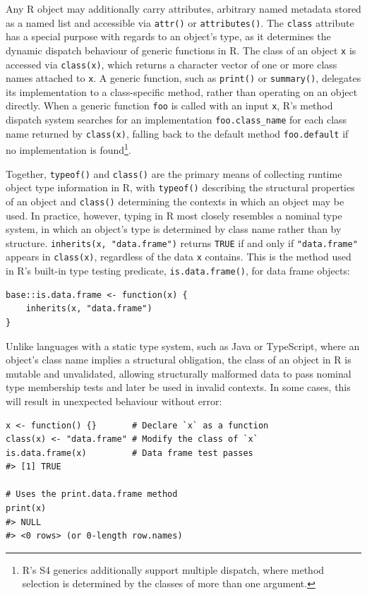 Any R object may additionally carry attributes, arbitrary named metadata stored as a named list and accessible via \texttt{attr()} or \texttt{attributes()}. The \texttt{class} attribute has a special purpose with regards to an object's type, as it determines the dynamic dispatch behaviour of generic functions in R. The class of an object \texttt{x} is accessed via \texttt{class(x)}, which returns a character vector of one or more class names attached to \texttt{x}. A generic function, such as \texttt{print()} or \texttt{summary()}, delegates its implementation to a class-specific method, rather than operating on an object directly. When a generic function \texttt{foo} is called with an input \texttt{x}, R's method dispatch system searches for an implementation \texttt{foo.class\_name} for each class name returned by \texttt{class(x)}, falling back to the default method \texttt{foo.default} if no implementation is found\footnote{R's S4 generics additionally support multiple dispatch, where method selection is determined by the classes of more than one argument.}.

Together, \texttt{typeof()} and \texttt{class()} are the primary means of collecting runtime object type information in R, with \texttt{typeof()} describing the structural properties of an object and \texttt{class()} determining the contexts in which an object may be used. In practice, however, typing in R most closely resembles a nominal type system, in which an object's type is determined by class name rather than by structure. \texttt{inherits(x,\ "data.frame")} returns \texttt{TRUE} if and only if \texttt{"data.frame"} appears in \texttt{class(x)}, regardless of the data \texttt{x} contains. This is the method used in R's built-in type testing predicate, \texttt{is.data.frame()}, for data frame objects:

\begin{verbatim}
base::is.data.frame <- function(x) {
    inherits(x, "data.frame")
}
\end{verbatim}

Unlike languages with a static type system, such as Java or TypeScript, where an object's class name implies a structural obligation, the class of an object in R is mutable and unvalidated, allowing structurally malformed data to pass nominal type membership tests and later be used in invalid contexts. In some cases, this will result in unexpected behaviour without error:

\begin{verbatim}
x <- function() {}       # Declare `x` as a function
class(x) <- "data.frame" # Modify the class of `x`
is.data.frame(x)         # Data frame test passes
#> [1] TRUE

# Uses the print.data.frame method
print(x)
#> NULL
#> <0 rows> (or 0-length row.names)
\end{verbatim}

